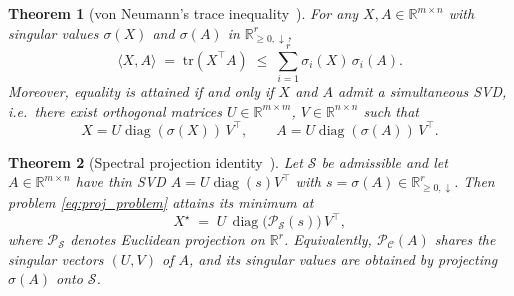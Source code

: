 \documentclass[journal]{IEEEtran}
\newtheorem{theorem}{Theorem}
\DeclareMathOperator{\diag}{diag}
\newcommand{\R}{\mathbb{R}}
\newcommand{\sgm}{\sigma}
\newcommand{\proj}{\mathcal{P}}
\newcommand{\spec}{\mathcal{S}}
\newcommand{\Cset}{\mathcal{C}}
\begin{document}
\begin{theorem}[von Neumann's trace inequality~\cite{vonNeumann1937}]
\label{thm:vN}
For any $X, A \in \R^{m\times n}$ with singular values
$\sgm(X)$ and $\sgm(A)$ in $\R^r_{\ge 0,\downarrow}$,
\begin{equation}\label{eq:vN}
\langle X, A\rangle \;=\; \mathrm{tr}(X^\top A)
\;\le\; \sum_{i=1}^{r} \sgm_i(X)\,\sgm_i(A).
\end{equation}
Moreover, equality is attained if and only if $X$ and $A$ admit a
\emph{simultaneous SVD}, i.e.\ there exist orthogonal matrices
$U \in \R^{m\times m}$, $V \in \R^{n\times n}$ such that
\begin{equation}\label{eq:sameUV}
X = U \diag(\sgm(X))\,V^\top, \qquad
A = U \diag(\sgm(A))\,V^\top.
\end{equation}
\end{theorem}

\begin{theorem}[Spectral projection identity~\cite{lewis1995,beck}]
\label{thm:proj}
Let $\spec$ be admissible and let $A \in \R^{m\times n}$ have thin SVD
$A = U \diag(s) V^\top$ with $s = \sgm(A) \in \R^r_{\ge 0,\downarrow}$.
Then problem \eqref{eq:proj_problem} attains its minimum at
\begin{equation}\label{eq:projC}
X^\star \;=\; U\,\diag\!\bigl(\proj_\spec(s)\bigr)\,V^\top,
\end{equation}
where $\proj_\spec$ denotes Euclidean projection on $\R^r$. Equivalently,
$\proj_\Cset(A)$ shares the singular vectors $(U, V)$ of $A$, and its
singular values are obtained by projecting $\sgm(A)$ onto $\spec$.
\end{theorem}
\end{document}
